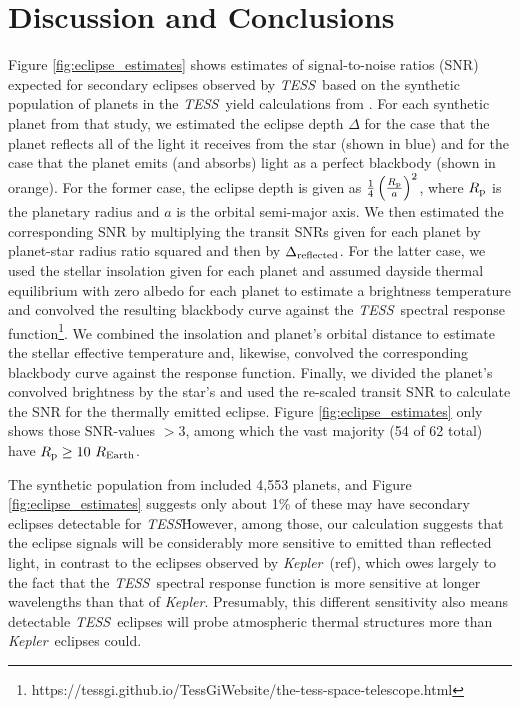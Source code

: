 \documentclass[manuscript]{aastex}
\newcommand{\kepler}{{\it Kepler}}
\newcommand{\tess}{{\it TESS}}
\begin{document}
\section{Discussion and Conclusions}
Figure \ref{fig:eclipse_estimates} shows estimates of signal-to-noise ratios (SNR) expected for secondary eclipses observed by \tess\ based on the synthetic population of planets in the \tess\ yield calculations from \citet{2018arXiv180405050B}. For each synthetic planet from that study, we estimated the eclipse depth $\Delta$ for the case that the planet reflects all of the light it receives from the star (shown in blue) and for the case that the planet emits (and absorbs) light as a perfect blackbody (shown in orange). For the former case, the eclipse depth is given as $\frac{1}{4} \left( \frac{R_{\rm p}}{a} \right)^2$, where $R_{\rm p}$ is the planetary radius and $a$ is the orbital semi-major axis. We then estimated the corresponding SNR by multiplying the transit SNRs given for each planet by planet-star radius ratio squared and then by $\Delta_{\rm reflected}$. For the latter case, we used the stellar insolation given for each planet and assumed dayside thermal equilibrium with zero albedo for each planet to estimate a brightness temperature and convolved the resulting blackbody curve against the \tess\ spectral response function\footnote{https://tessgi.github.io/TessGiWebsite/the-tess-space-telescope.html}. We combined the insolation and planet's orbital distance to estimate the stellar effective temperature and, likewise, convolved the corresponding blackbody curve against the response function. Finally, we divided the planet's convolved brightness by the star's and used the re-scaled transit SNR to calculate the SNR for the thermally emitted eclipse. Figure \ref{fig:eclipse_estimates} only shows those SNR-values $> 3$, among which the vast majority (54 of 62 total) have $R_{\rm p} \geq 10\ R_{\rm Earth}$.

The synthetic population from \citet{2018arXiv180405050B} included 4,553 planets, and Figure \ref{fig:eclipse_estimates} suggests only about 1\% of these may have secondary eclipses detectable for \tess\. However, among those, our calculation suggests that the eclipse signals will be considerably more sensitive to emitted than reflected light, in contrast to the eclipses observed by \kepler\ (ref), which owes largely to the fact that the \tess\ spectral response function is more sensitive at longer wavelengths than that of \kepler. Presumably, this different sensitivity also means detectable \tess\ eclipses will probe atmospheric thermal structures more than \kepler\ eclipses could.
\end{document}
